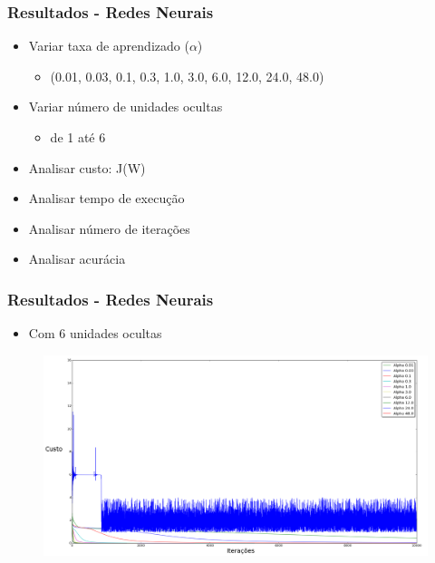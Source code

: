 \documentclass[10pt]{beamer}
\begin{document}
\begin{frame}
 \frametitle{Resultados - Redes Neurais}

 \begin{itemize}
  \item Variar taxa de aprendizado ($\alpha$)
    \begin{itemize}
      \item (0.01, 0.03, 0.1, 0.3, 1.0, 3.0, 6.0, 12.0, 24.0, 48.0)
    \end{itemize}

  \item Variar número de unidades ocultas
  \begin{itemize}
      \item de 1 até 6
    \end{itemize}

  \item Analisar custo: J(W)

  \item Analisar tempo de execução

  \item Analisar número de iterações

  \item Analisar acurácia

 \end{itemize}

\end{frame}


\begin{frame}
 \frametitle{Resultados - Redes Neurais}

 \begin{itemize}
  \item Com 6 unidades ocultas
 \end{itemize}

  \begin{adjustwidth}{-3em}{-3em}
  \begin{figure}[htb]
    \begin{center}
        \includegraphics[scale=0.18]{img/alphas_rnn.png}
    \end{center}
  \end{figure}
  \end{adjustwidth}
\end{frame}
\end{document}
